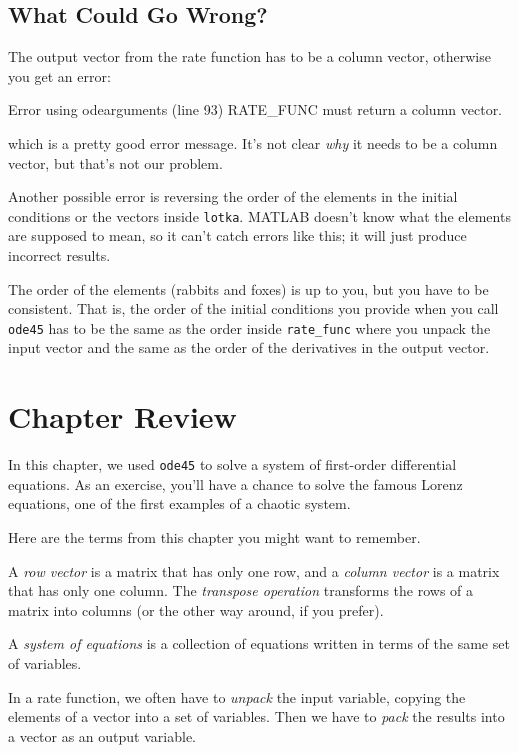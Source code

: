 \documentclass[../../book.tex]{subfiles}
\begin{document}


\subsection{What Could Go Wrong?}

The output vector from the rate function has to be a column vector, otherwise you get an error:

\begin{code}
Error using odearguments (line 93)
RATE_FUNC must return a column vector.
\end{code}
which is a pretty good error message.  It's not clear \emph{why}
it needs to be a column vector, but that's not our problem.


Another possible error is reversing the order of the elements in the
initial conditions or the vectors inside \lstinline{lotka}.  MATLAB
doesn't know what the elements are supposed to mean, so it can't catch
errors like this; it will just produce incorrect results.

The order of the elements (rabbits and foxes) is up to you, but
you have to be consistent.  That is, the order of the initial conditions you
provide when you call \lstinline{ode45} has to be the same as the order
inside \lstinline{rate_func} where you unpack the input vector and the
same as the order of the derivatives in the output vector.

\section{Chapter Review}

In this chapter, we used \lstinline{ode45} to solve a system of first-order differential equations.
As an exercise, you'll have a chance to solve the famous Lorenz equations, one of the first examples of a chaotic system.

Here are the terms from this chapter you might want to remember.

A \emph{row vector} is a matrix that has only one row, and a \emph{column vector} is a matrix that has only one column.
The \emph{transpose operation} transforms the  rows of a matrix
into columns (or the other way around, if you prefer).

A \emph{system of equations} is a collection of equations written in terms of
the same set of variables.

In a rate function, we often have to \emph{unpack} the input variable,
copying the elements of a vector into a set of variables.
Then we have to \emph{pack} the results into a vector as an output variable.
\end{document}
